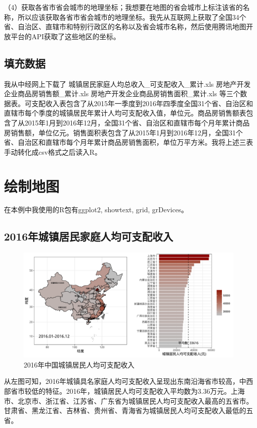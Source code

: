 \documentclass[11pt,a4paper,onecolumn]{article}
\begin{document}
（4）获取各省市省会城市的地理坐标；我想要在地图的省会城市上标注该省的名称，所以应该获取各省市省会城市的地理坐标。我先从互联网上获取了全国34个省、自治区、直辖市和特别行政区的名称以及省会城市名称，然后使用腾讯地图开放平台的API获取了这些地区的坐标。

\subsection{填充数据}

我从中经网上下载了 城镇居民家庭人均总收入\_可支配收入\_累计.xls 房地产开发企业商品房销售额\_累计.xls 房地产开发企业商品房销售面积\_累计.xls 等三个数据表。可支配收入表包含了从2015年一季度到2016年四季度全国31个省、自治区和直辖市每个季度的城镇居民年累计人均可支配收入值，单位元。商品房销售额表包含了从2015年1月到2016年12月，全国31个省、自治区和直辖市每个月年累计商品房销售额，单位亿元。销售面积表包含了从2015年1月到2016年12月，全国31个省、自治区和直辖市每个月年累计商品房销售面积，单位万平方米。我将上述三表手动转化成csv格式之后读入R。

\section{绘制地图}

在本例中我使用的R包有ggplot2, showtext, grid, grDevices。

\subsection{2016年城镇居民家庭人均可支配收入}

\begin{figure}[H]
	\centering
	\includegraphics[width=400pt]{城镇居民人均可支配收入.pdf}
	\caption{2016年中国城镇居民人均可支配收入}
\end{figure}

从左图可知，2016年城镇具名家庭人均可支配收入呈现出东南沿海省市较高，中西部省市较低的特征。2016年，城镇居民人均可支配收入平均数为3.36万元。上海市、北京市、浙江省、江苏省、广东省为城镇居民人均可支配收入最高的五省市。甘肃省、黑龙江省、吉林省、贵州省、青海省为城镇居民人均可支配收入最低的五省。
\end{document}
